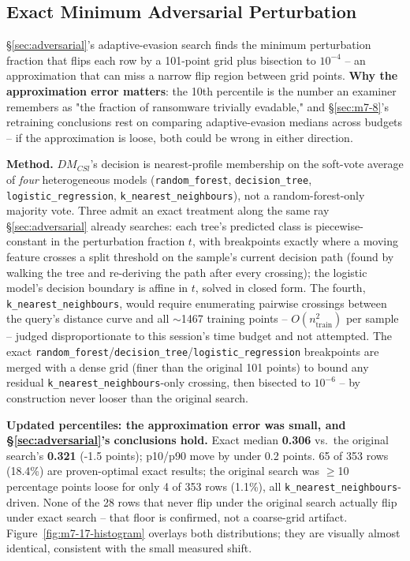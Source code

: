\documentclass[conference]{IEEEtran}
\begin{document}
\subsection{Exact Minimum Adversarial Perturbation}
\label{sec:m7-17}

\S\ref{sec:adversarial}'s adaptive-evasion search finds the minimum perturbation fraction that
flips each row by a 101-point grid plus bisection to $10^{-4}$ -- an approximation that can miss a
narrow flip region between grid points. \textbf{Why the approximation error matters}: the 10th
percentile is the number an examiner remembers as "the fraction of ransomware trivially evadable,"
and \S\ref{sec:m7-8}'s retraining conclusions rest on comparing adaptive-evasion medians across
budgets -- if the approximation is loose, both could be wrong in either direction.

\textbf{Method.} $DM_{CSl}$'s decision is nearest-profile membership on the soft-vote average of
\emph{four} heterogeneous models (\texttt{random\_forest}, \texttt{decision\_tree},
\texttt{logistic\_regression}, \texttt{k\_nearest\_neighbours}), not a random-forest-only
majority vote. Three admit an exact treatment along the same ray \S\ref{sec:adversarial} already
searches: each tree's predicted class is piecewise-constant in the perturbation fraction $t$, with
breakpoints exactly where a moving feature crosses a split threshold on the sample's current
decision path (found by walking the tree and re-deriving the path after every crossing); the
logistic model's decision boundary is affine in $t$, solved in closed form. The fourth,
\texttt{k\_nearest\_neighbours}, would require enumerating pairwise crossings between the query's
distance curve and all $\sim$1467 training points -- $O(n_{\text{train}}^2)$ per sample -- judged
disproportionate to this session's time budget and not attempted. The exact
\texttt{random\_forest}/\texttt{decision\_tree}/\texttt{logistic\_regression} breakpoints are
merged with a dense grid (finer than the original 101 points) to bound any residual
\texttt{k\_nearest\_neighbours}-only crossing, then bisected to $10^{-6}$ -- by construction never
looser than the original search.

\textbf{Updated percentiles: the approximation error was small, and \S\ref{sec:adversarial}'s
conclusions hold.} Exact median \textbf{0.306} vs.\ the original search's \textbf{0.321}
(-1.5 points); p10/p90 move by under 0.2 points. 65 of 353 rows (18.4\%) are proven-optimal exact
results; the original search was $\geq$10 percentage points loose for only 4 of 353 rows (1.1\%),
all \texttt{k\_nearest\_neighbours}-driven. None of the 28 rows that never flip under the original
search actually flip under exact search -- that floor is confirmed, not a coarse-grid artifact.
Figure~\ref{fig:m7-17-histogram} overlays both distributions; they are visually almost identical,
consistent with the small measured shift.
\end{document}
